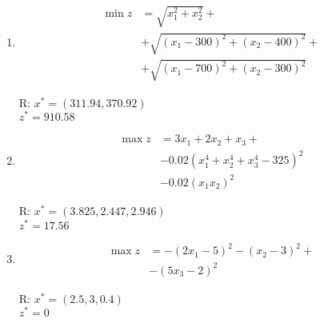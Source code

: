 \documentclass[italian,12pt]{article}
\begin{document}
\begin{enumerate}
	\item 
	\begin{minipage}{0.50\textwidth}
		\begin{equation*}
			\begin{split}
				\min z & = \sqrt{x_1^2 + x_2^2} +\\
				       & + \sqrt{(x_1-300)^2+(x_2-400)^2} +\\
				       & + \sqrt{(x_1-700)^2+(x_2-300)^2}
			\end{split}
		\end{equation*}
	\end{minipage}
	\begin{minipage}{0.40\textwidth}
		\begin{flushright}
			R: $x^* = (311.94, 370.92)$\\
			$z^* = 910.58$
		\end{flushright}
	\end{minipage}
	
	\item 
	\begin{minipage}{0.50\textwidth}
		\begin{equation*}
			\begin{split}
				\max z & = 3 x_1 + 2 x_2 + x_3 +\\
				       & - 0.02 (x_1^4 + x_2^4 + x_3^4 - 325)^2\\
				       & - 0.02 (x_1 x_2)^2
			\end{split}
		\end{equation*}
	\end{minipage}
	\begin{minipage}{0.40\textwidth}
		\begin{flushright}
			R: $x^* = (3.825, 2.447, 2.946)$\\
			$z^* = 17.56$
		\end{flushright}
	\end{minipage}
	
	\item 
	\begin{minipage}{0.50\textwidth}
		\begin{equation*}
			\begin{split}
				\max z &= -(2 x_1 - 5)^2 - (x_2 - 3)^2 +\\
				&- (5 x_3 - 2)^2
			\end{split}
		\end{equation*}
	\end{minipage}
	\begin{minipage}{0.40\textwidth}
		\begin{flushright}
			R: $x^* = (2.5, 3, 0.4)$\\
			$z^* = 0$
		\end{flushright}
	\end{minipage}


\end{enumerate}
\end{document}
